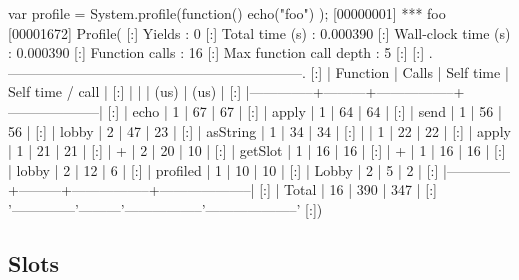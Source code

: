 \begin{urbiscript}
var profile = System.profile(function() { echo("foo") });
[00000001] *** foo
[00001672] Profile(
[:]  Yields                   : 0
[:]  Total time (s)           : 0.000390
[:]  Wall-clock time (s)      : 0.000390
[:]  Function calls           : 16
[:]  Max function call depth  : 5
[:]
[:]  .---------------------------------------------------------------.
[:]  |   Function   |  Calls  |    Self time    |  Self time / call  |
[:]  |              |         |       (us)      |        (us)        |
[:]  |--------------+---------+-----------------+--------------------|
[:]  |         echo |       1 |              67 |                 67 |
[:]  |        apply |       1 |              64 |                 64 |
[:]  |         send |       1 |              56 |                 56 |
[:]  |        lobby |       2 |              47 |                 23 |
[:]  |     asString |       1 |              34 |                 34 |
[:]  |              |       1 |              22 |                 22 |
[:]  |        apply |       1 |              21 |                 21 |
[:]  |            + |       2 |              20 |                 10 |
[:]  |      getSlot |       1 |              16 |                 16 |
[:]  |            + |       1 |              16 |                 16 |
[:]  |        lobby |       2 |              12 |                  6 |
[:]  |     profiled |       1 |              10 |                 10 |
[:]  |        Lobby |       2 |               5 |                  2 |
[:]  |--------------+---------+-----------------+--------------------|
[:]  |        Total |      16 |             390 |                347 |
[:]  '--------------'---------'-----------------'--------------------'
[:])
\end{urbiscript}

\subsection{Slots}

